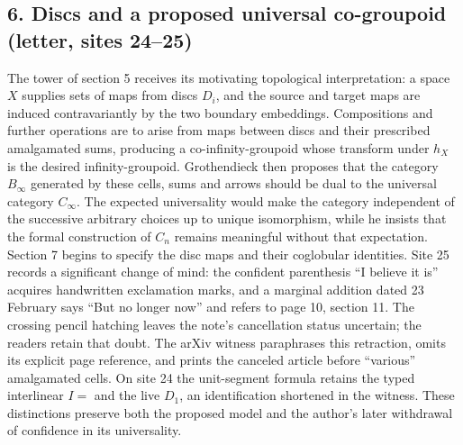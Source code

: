 \documentclass[10pt,oneside]{book}
\begin{document}
\subsection*{6. Discs and a proposed universal co-groupoid (letter, sites 24--25)}
The tower of section 5 receives its motivating topological interpretation: a space $X$ supplies sets of maps from discs $D_i$, and the source and target maps are induced contravariantly by the two boundary embeddings. Compositions and further operations are to arise from maps between discs and their prescribed amalgamated sums, producing a co-infinity-groupoid whose transform under $h_X$ is the desired infinity-groupoid. Grothendieck then proposes that the category $B_\infty$ generated by these cells, sums and arrows should be dual to the universal category $C_\infty$. The expected universality would make the category independent of the successive arbitrary choices up to unique isomorphism, while he insists that the formal construction of $C_n$ remains meaningful without that expectation. Section 7 begins to specify the disc maps and their coglobular identities. Site 25 records a significant change of mind: the confident parenthesis ``I believe it is'' acquires handwritten exclamation marks, and a marginal addition dated 23 February says ``But no longer now'' and refers to page 10, section 11. The crossing pencil hatching leaves the note's cancellation status uncertain; the readers retain that doubt. The arXiv witness paraphrases this retraction, omits its explicit page reference, and prints the canceled article before ``various'' amalgamated cells. On site 24 the unit-segment formula retains the typed interlinear $I=$ and the live $D_1$, an identification shortened in the witness. These distinctions preserve both the proposed model and the author's later withdrawal of confidence in its universality.
\end{document}
